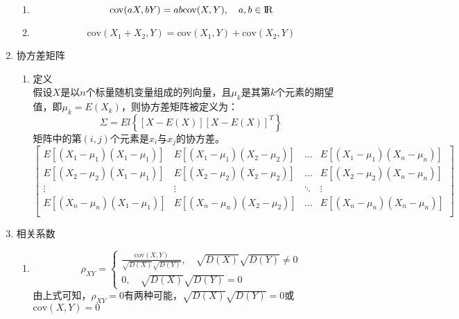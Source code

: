 \begin{enumerate}
\begin{enumerate}
		\item 
		\begin{equation}
			\mathrm{cov}(aX, bY) = ab\mathrm{cov}(X,Y), \quad a,b\in {\rm I\!R}
		\end{equation}

		\item 
		\begin{equation}
			\mathrm{cov}(X_1+X_2, Y) = \mathrm{cov}(X_1, Y) + \mathrm{cov}(X_2, Y)
		\end{equation}
	\end{enumerate}

	\item 协方差矩阵 \\
	\begin{enumerate}
		\item 定义 \\
		假设$X$是以$n$个标量随机变量组成的列向量，且$\mu_k$是其第$k$个元素的期望值，即$\mu_k=E(X_k)$，则协方差矩阵被定义为：
		\begin{equation}
			\Sigma = El\left\{\left[X-E(X)\right]\left[X-E(X)\right]^T\right\}
		\end{equation}
		矩阵中的第$(i,j)$个元素是$x_i$与$x_j$的协方差。
		\begin{equation}
		\left[\begin{matrix}
		E\left[(X_1-\mu_1)(X_1-\mu_1)\right] & E\left[(X_1-\mu_1)(X_2-\mu_2)\right] & \dots & E\left[(X_1-\mu_1)(X_n-\mu_n)\right] \\
		E\left[(X_2-\mu_2)(X_1-\mu_1)\right] & E\left[(X_2-\mu_2)(X_2-\mu_2)\right] & \dots & E\left[(X_2-\mu_2)(X_n-\mu_n)\right] \\
		\vdots & \vdots & \ddots & \vdots \\
		E\left[(X_n-\mu_n)(X_1-\mu_1)\right] & E\left[(X_n-\mu_n)(X_2-\mu_2)\right] & \dots & E\left[(X_n-\mu_n)(X_n-\mu_n)\right] \\
		\end{matrix}\right]
		\end{equation}
	\end{enumerate}
	
	
	\item 相关系数
	\begin{enumerate}
		\item 
		\[ \rho_{XY}=\begin{cases}
			\frac{\mathrm{cov}(X,Y)}{\sqrt{D(X)}\sqrt{D(Y)}}, \quad \sqrt{D(X)}\sqrt{D(Y)} \neq 0 \\
			0, \quad \sqrt{D(X)}\sqrt{D(Y)} = 0
		\end{cases} \]
		由上式可知，$\rho_{XY} = 0$有两种可能，$\sqrt{D(X)}\sqrt{D(Y)} = 0$或$\mathrm{cov}(X,Y)=0$


\end{enumerate}
\end{enumerate}
